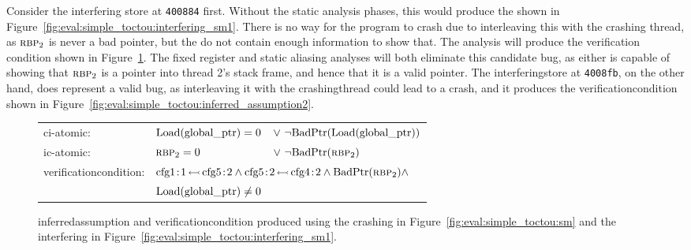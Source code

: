 Consider the interfering store at \texttt{400884} first.  Without the
static analysis phases, this would produce the {\StateMachine} shown
in Figure~\ref{fig:eval:simple_toctou:interfering_sm1}.  There is no
way for the program to crash due to interleaving this {\StateMachine}
with the crashing thread, as $\textsc{rbp}_{2}$ is never a bad pointer,
but the {\StateMachines} do not contain enough information to show
that.  The analysis will produce the verification condition shown in
Figure~\ref{fig:eval:simple_toctou:inferred_assumption1}. The fixed
register and static aliasing analyses will both eliminate this
candidate bug, as either is capable of showing that $\textsc{rbp}_{2}$
is a pointer into thread 2's stack frame, and hence that it is a valid
pointer.  The \gls{interferingstore} at \texttt{4008fb}, on the other
hand, does represent a valid bug, as interleaving it with the
\gls{crashingthread} could lead to a crash, and it produces the
\gls{verificationcondition} shown in
Figure~\ref{fig:eval:simple_toctou:inferred_assumption2}.

\begin{figure}
  \begin{tabular}{lll}
    \gls{ci-atomic}: & $\mathrm{Load}(\mathrm{global\_ptr}) = 0$ &\!\!\!$\vee\,\, \neg\mathrm{BadPtr}(\mathrm{Load}(\mathrm{global\_ptr}))$ \\
    \gls{ic-atomic}: & $\textsc{rbp}_{2} = 0$                &\!\!\!$\vee\,\, \neg\mathrm{BadPtr}(\textsc{rbp}_{2})$\\
    \Gls{verificationcondition}: & \multicolumn{2}{l}{$\happensBefore{\mai{cfg1}{1}}{\mai{cfg5}{2}} \wedge \happensBefore{\mai{cfg5}{2}}{\mai{cfg4}{2}} \wedge \smBadPtr{\smReg{rbp}{2}}  \wedge$}\\
                                      & $\mathrm{Load}(\mathrm{global\_ptr}) \not= 0$\\
  \end{tabular}
  \caption{\Gls{inferredassumption} and \gls{verificationcondition}
    produced using the crashing {\StateMachine} in
    Figure~\ref{fig:eval:simple_toctou:sm} and the interfering
    {\StateMachine} in
    Figure~\ref{fig:eval:simple_toctou:interfering_sm1}.}
  \label{fig:eval:simple_toctou:inferred_assumption1}
\end{figure}

